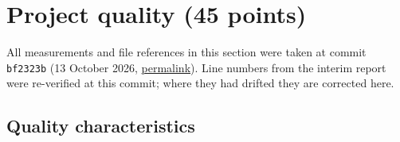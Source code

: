 %

\providecommand{\repocommit}{bf2323b}
\providecommand{\repocommitfull}{bf2323b3021c9d3db7a31e1e7d61068c3f704497}
\providecommand{\code}[1]{\texttt{\detokenize{#1}}}
\providecommand{\permalink}[2]{\href{https://github.com/anthropics/claude-code/blob/\repocommitfull/#1\##2}{\code{#1}}}
\providecommand{\todo}[1]{\textcolor{red}{[TODO: #1]}}

\section{Project quality (45 points)}
\label{sec:quality}

All measurements and file references in this section were taken at commit \texttt{\repocommit} (13 October 2026,
\href{https://github.com/anthropics/claude-code/tree/\repocommitfull}{permalink}). Line numbers from the interim report
were re-verified at this commit; where they had drifted they are corrected here.

\subsection{Quality characteristics}
\label{sec:quality:characteristics}


